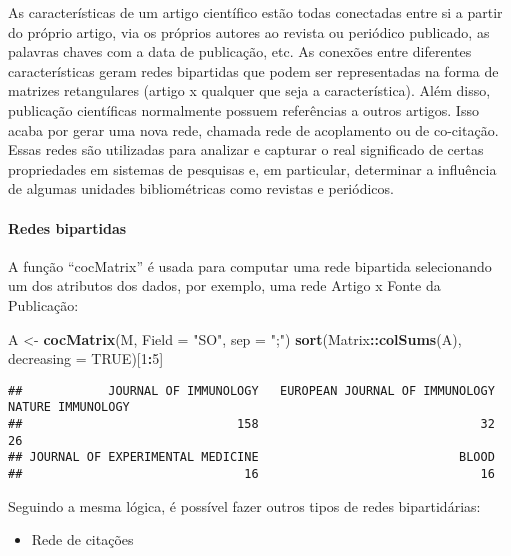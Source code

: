 \documentclass[]{article}
\newenvironment{Shaded}{\begin{snugshade}}{\end{snugshade}}
\newcommand{\DataTypeTok}[1]{\textcolor[rgb]{0.13,0.29,0.53}{#1}}
\newcommand{\DecValTok}[1]{\textcolor[rgb]{0.00,0.00,0.81}{#1}}
\newcommand{\KeywordTok}[1]{\textcolor[rgb]{0.13,0.29,0.53}{\textbf{#1}}}
\newcommand{\NormalTok}[1]{#1}
\newcommand{\OperatorTok}[1]{\textcolor[rgb]{0.81,0.36,0.00}{\textbf{#1}}}
\newcommand{\OtherTok}[1]{\textcolor[rgb]{0.56,0.35,0.01}{#1}}
\newcommand{\StringTok}[1]{\textcolor[rgb]{0.31,0.60,0.02}{#1}}
\providecommand{\tightlist}{%
  \setlength{\itemsep}{0pt}\setlength{\parskip}{0pt}}
\let\oldparagraph\paragraph
\renewcommand{\paragraph}[1]{\oldparagraph{#1}\mbox{}}
\begin{document}
As características de um artigo científico estão todas conectadas entre
si a partir do próprio artigo, via os próprios autores ao revista ou
periódico publicado, as palavras chaves com a data de publicação, etc.
As conexões entre diferentes características geram redes bipartidas que
podem ser representadas na forma de matrizes retangulares (artigo x
qualquer que seja a característica). Além disso, publicação científicas
normalmente possuem referências a outros artigos. Isso acaba por gerar
uma nova rede, chamada rede de acoplamento ou de co-citação. Essas redes
são utilizadas para analizar e capturar o real significado de certas
propriedades em sistemas de pesquisas e, em particular, determinar a
influência de algumas unidades bibliométricas como revistas e
periódicos.

\hypertarget{redes-bipartidas}{%
\paragraph{Redes bipartidas}\label{redes-bipartidas}}

A função ``cocMatrix'' é usada para computar uma rede bipartida
selecionando um dos atributos dos dados, por exemplo, uma rede Artigo x
Fonte da Publicação:

\begin{Shaded}
\begin{Highlighting}[]
\NormalTok{A <-}\StringTok{ }\KeywordTok{cocMatrix}\NormalTok{(M, }\DataTypeTok{Field =} \StringTok{"SO"}\NormalTok{, }\DataTypeTok{sep =} \StringTok{";"}\NormalTok{)}
\KeywordTok{sort}\NormalTok{(Matrix}\OperatorTok{::}\KeywordTok{colSums}\NormalTok{(A), }\DataTypeTok{decreasing =} \OtherTok{TRUE}\NormalTok{)[}\DecValTok{1}\OperatorTok{:}\DecValTok{5}\NormalTok{]}
\end{Highlighting}
\end{Shaded}

\begin{verbatim}
##            JOURNAL OF IMMUNOLOGY   EUROPEAN JOURNAL OF IMMUNOLOGY                NATURE IMMUNOLOGY 
##                              158                               32                               26 
## JOURNAL OF EXPERIMENTAL MEDICINE                            BLOOD 
##                               16                               16
\end{verbatim}

Seguindo a mesma lógica, é possível fazer outros tipos de redes
bipartidárias:

\begin{itemize}
\tightlist
\item
  Rede de citações
\end{itemize}
\end{document}
